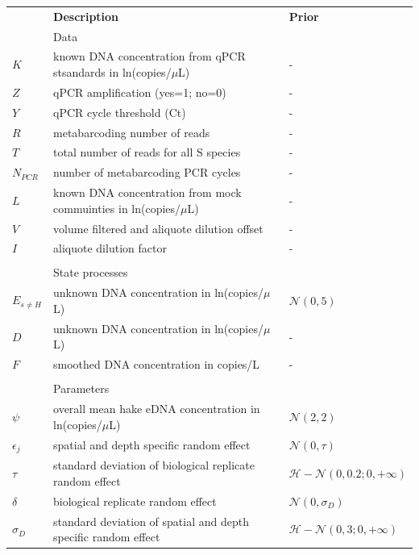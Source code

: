 \documentclass{article}
\begin{document}
\begin{table}[h]
    \centering
    \begin{tabular}{lll}
         & \textbf{Description} & \textbf{Prior} \\
&Data & \\
\hline
$K$ & known DNA concentration from qPCR stsandards in ln(copies/$\mu$L) & - \\
$Z$ & qPCR amplification (yes=1; no=0) & - \\
$Y$ & qPCR cycle threshold (Ct) & - \\
$R$ & metabarcoding number of reads & - \\
$T$ & total number of reads for all S species & - \\
$N_{PCR}$ & number of metabarcoding PCR cycles & - \\
$L$ & known DNA concentration from mock commuinties in ln(copies/$\mu$L) & - \\
$V$ & volume filtered and aliquote dilution offset & -\\
$I$ & aliquote dilution factor & -\\

&&\\
&State processes&\\
\hline
$E_{s\neq H}$ & unknown DNA concentration in ln(copies/$\mu$L) & $\mathcal{N}(0,5)$\\
$D$ & unknown DNA concentration in ln(copies/$\mu$L)& - \\
$F$ & smoothed DNA concentration in copies/L & - \\
&&\\

&Parameters&\\
\hline
$\psi$& overall mean hake eDNA concentration in ln(copies/$\mu$L) & $\mathcal{N}(2,2)$\\
$\epsilon_{j}$& spatial and depth specific random effect & $\mathcal{N}(0,\tau)$\\
$\tau$& standard deviation of biological replicate random effect & $\mathcal{H-N}(0,0.2;0, +\infty)$\\

$\delta$& biological replicate random effect & $\mathcal{N}(0,\sigma_D)$\\
$\sigma_D $& standard deviation of spatial and depth specific random effect & $\mathcal{H-N}(0,3;0, +\infty)$\\


\end{tabular}
\end{table}
\end{document}
